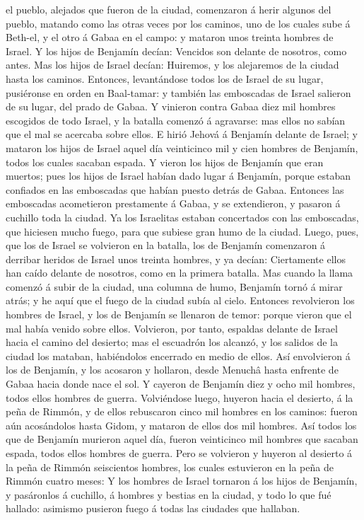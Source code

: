 el pueblo, alejados que fueron de la ciudad, comenzaron á herir algunos
del pueblo, matando como las otras veces por los caminos, uno de los
cuales sube á Beth-el, y el otro á Gabaa en el campo: y mataron unos
treinta hombres de Israel.  Y los hijos de Benjamín
decían: Vencidos son delante de nosotros, como antes. Mas los hijos de
Israel decían: Huiremos, y los alejaremos de la ciudad hasta los
caminos.  Entonces, levantándose todos los de Israel de
su lugar, pusiéronse en orden en Baal-tamar: y también las emboscadas de
Israel salieron de su lugar, del prado de Gabaa.  Y
vinieron contra Gabaa diez mil hombres escogidos de todo Israel, y la
batalla comenzó á agravarse: mas ellos no sabían que el mal se acercaba
sobre ellos.  E hirió Jehová á Benjamín delante de
Israel; y mataron los hijos de Israel aquel día veinticinco mil y cien
hombres de Benjamín, todos los cuales sacaban espada.  Y
vieron los hijos de Benjamín que eran muertos; pues los hijos de Israel
habían dado lugar á Benjamín, porque estaban confiados en las emboscadas
que habían puesto detrás de Gabaa.  Entonces las
emboscadas acometieron prestamente á Gabaa, y se extendieron, y pasaron
á cuchillo toda la ciudad.  Ya los Israelitas estaban
concertados con las emboscadas, que hiciesen mucho fuego, para que
subiese gran humo de la ciudad.  Luego, pues, que los de
Israel se volvieron en la batalla, los de Benjamín comenzaron á derribar
heridos de Israel unos treinta hombres, y ya decían: Ciertamente ellos
han caído delante de nosotros, como en la primera batalla.
 Mas cuando la llama comenzó á subir de la ciudad, una
columna de humo, Benjamín tornó á mirar atrás; y he aquí que el fuego de
la ciudad subía al cielo.  Entonces revolvieron los
hombres de Israel, y los de Benjamín se llenaron de temor: porque vieron
que el mal había venido sobre ellos.  Volvieron, por
tanto, espaldas delante de Israel hacia el camino del desierto; mas el
escuadrón los alcanzó, y los salidos de la ciudad los mataban,
habiéndolos encerrado en medio de ellos.  Así envolvieron
á los de Benjamín, y los acosaron y hollaron, desde Menuchâ hasta
enfrente de Gabaa hacia donde nace el sol.  Y cayeron de
Benjamín diez y ocho mil hombres, todos ellos hombres de guerra.
 Volviéndose luego, huyeron hacia el desierto, á la peña
de Rimmón, y de ellos rebuscaron cinco mil hombres en los caminos:
fueron aún acosándolos hasta Gidom, y mataron de ellos dos mil hombres.
 Así todos los que de Benjamín murieron aquel día, fueron
veinticinco mil hombres que sacaban espada, todos ellos hombres de
guerra.  Pero se volvieron y huyeron al desierto á la
peña de Rimmón seiscientos hombres, los cuales estuvieron en la peña de
Rimmón cuatro meses:  Y los hombres de Israel tornaron á
los hijos de Benjamín, y pasáronlos á cuchillo, á hombres y bestias en
la ciudad, y todo lo que fué hallado: asimismo pusieron fuego á todas
las ciudades que hallaban.

